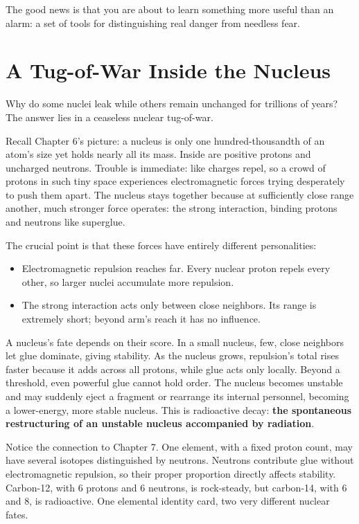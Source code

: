 The good news is that you are about to learn something more useful than an alarm: a set of tools for distinguishing real danger from needless fear.

\section{A Tug-of-War Inside the Nucleus}

Why do some nuclei leak while others remain unchanged for trillions of years? The answer lies in a ceaseless nuclear tug-of-war.

Recall Chapter 6's picture: a nucleus is only one hundred-thousandth of an atom's size yet holds nearly all its mass. Inside are positive protons and uncharged neutrons. Trouble is immediate: like charges repel, so a crowd of protons in such tiny space experiences electromagnetic forces trying desperately to push them apart. The nucleus stays together because at sufficiently close range another, much stronger force operates: the strong interaction, binding protons and neutrons like superglue.

The crucial point is that these forces have entirely different personalities:

\begin{itemize}[itemsep=2pt]
\item Electromagnetic repulsion reaches far. Every nuclear proton repels every other, so larger nuclei accumulate more repulsion.
\item The strong interaction acts only between close neighbors. Its range is extremely short; beyond arm's reach it has no influence.
\end{itemize}

A nucleus's fate depends on their score. In a small nucleus, few, close neighbors let glue dominate, giving stability. As the nucleus grows, repulsion's total rises faster because it adds across all protons, while glue acts only locally. Beyond a threshold, even powerful glue cannot hold order. The nucleus becomes unstable and may suddenly eject a fragment or rearrange its internal personnel, becoming a lower-energy, more stable nucleus. This is radioactive decay: \textbf{the spontaneous restructuring of an unstable nucleus accompanied by radiation}.

Notice the connection to Chapter 7. One element, with a fixed proton count, may have several isotopes distinguished by neutrons. Neutrons contribute glue without electromagnetic repulsion, so their proper proportion directly affects stability. Carbon-12, with 6 protons and 6 neutrons, is rock-steady, but carbon-14, with 6 and 8, is radioactive. One elemental identity card, two very different nuclear fates.

